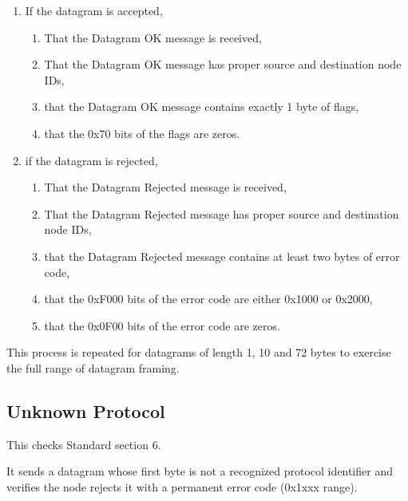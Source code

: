 \begin{enumerate}
\item If the datagram is accepted,
    \begin{enumerate}
    \item That the Datagram OK message is received,
    \item That the Datagram OK message has proper source and destination node IDs, 
    \item that the Datagram OK message contains exactly 1 byte of flags,
    \item that the 0x70 bits of the flags are zeros.
    \end{enumerate}
\item if the datagram is rejected, 
    \begin{enumerate}
    \item That the Datagram Rejected message is received,
    \item That the Datagram Rejected message has proper source and destination node IDs, 
    \item that the Datagram Rejected message contains at least two bytes of error code,
    \item that the 0xF000 bits of the error code are either 0x1000 or 0x2000,
    \item that the 0x0F00 bits of the error code are zeros.
    \end{enumerate}
\end{enumerate}

This process is repeated for datagrams of length 1, 10 and 72 bytes to exercise the full
range of datagram framing.

\subsection{Unknown Protocol}

This checks Standard section 6.

It sends a datagram whose first byte is not a recognized protocol identifier and
verifies the node rejects it with a permanent error code (0x1xxx range).

  
